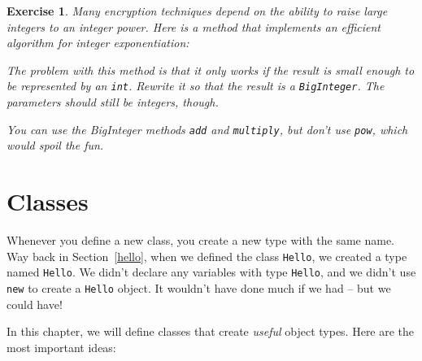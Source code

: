 \documentclass[12pt]{book}
\theoremstyle{exercise}
\newtheorem{exercise}{Exercise}[chapter]
\newcommand{\java}[1]{\verb"#1"}
\newcommand{\java}[1]{\lstinline{#1}} %
\begin{document}
\begin{exercise}
Many encryption techniques depend on the ability to raise large integers to an integer power.
Here is a method that implements an efficient algorithm for integer exponentiation:


The problem with this method is that it only works if the result is small enough to be represented by an \java{int}.
Rewrite it so that the result is a \java{BigInteger}.
The parameters should still be integers, though.

You can use the BigInteger methods \java{add} and \java{multiply}, but don't use \java{pow}, which would spoil the fun.
\end{exercise}




\chapter{Classes}


Whenever you define a new class, you create a new type with the same name.
Way back in Section~\ref{hello}, when we defined the class \java{Hello}, we created a type named \java{Hello}.
We didn't declare any variables with type \java{Hello}, and we didn't use \java{new} to create a \java{Hello} object.
It wouldn't have done much if we had -- but we could have!


In this chapter, we will define classes that create {\em useful} object types.
Here are the most important ideas:
\end{document}
